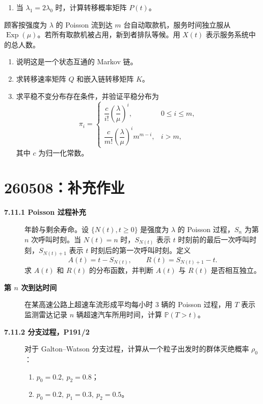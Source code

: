 \documentclass[12pt,a4paper,openany]{ctexrep}
\theoremstyle{definition}
\newcommand{\Pp}{\mathbb{P}}
\newcommand{\Exp}{\operatorname{Exp}}
\begin{document}
\begin{description}
\begin{enumerate}[label=(\arabic*)]
		\item 当 $\lambda_1=2\lambda_0$ 时，计算转移概率矩阵 $P(t)$。
	\end{enumerate}
	\item[\textbf{P250/3，练习 5.8(3)}] 顾客按强度为 $\lambda$ 的 Poisson 流到达 $m$ 台自动取款机，服务时间独立服从 $\Exp(\mu)$。若所有取款机被占用，新到者排队等候。用 $X(t)$ 表示服务系统中的总人数。
	\begin{enumerate}[label=(\arabic*)]
		\item 说明这是一个状态互通的 Markov 链。
		\item 求转移速率矩阵 $Q$ 和嵌入链转移矩阵 $K$。
		\item 求平稳不变分布存在条件，并验证平稳分布为
		\[
		\pi_i=
		\begin{cases}
		\dfrac{c}{i!}\left(\dfrac{\lambda}{\mu}\right)^i,&0\le i\le m,\\[2ex]
		\dfrac{c}{m!}\left(\dfrac{\lambda}{\mu}\right)^i m^{m-i},&i>m,
		\end{cases}
		\]
		其中 $c$ 为归一化常数。
	\end{enumerate}
\end{description}

\section{260508：补充作业}

\begin{description}
	\item[\textbf{7.11.1 Poisson 过程补充}] 年龄与剩余寿命。设 $\{N(t),t\ge0\}$ 是强度为 $\lambda$ 的 Poisson 过程，$S_n$ 为第 $n$ 次呼叫时刻。当 $N(t)=n$ 时，$S_{N(t)}$ 表示 $t$ 时刻前的最后一次呼叫时刻，$S_{N(t)+1}$ 表示 $t$ 时刻后的第一次呼叫时刻。定义
	\[
	A(t)=t-S_{N(t)},\qquad R(t)=S_{N(t)+1}-t.
	\]
	求 $A(t)$ 和 $R(t)$ 的分布函数，并判断 $A(t)$ 与 $R(t)$ 是否相互独立。
	\item[\textbf{第 $n$ 次到达时间}] 在某高速公路上超速车流形成平均每小时 $3$ 辆的 Poisson 过程，用 $T$ 表示监测雷达记录 $n$ 辆超速汽车所用时间，计算 $\Pp(T>t)$。
	\item[\textbf{7.11.2 分支过程，P191/2}] 对于 Galton--Watson 分支过程，计算从一个粒子出发时的群体灭绝概率 $\rho_0$：
	\begin{enumerate}[label=(\arabic*)]
		\item $p_0=0.2,\ p_2=0.8$；
		\item $p_0=0.2,\ p_1=0.3,\ p_2=0.5$。
	\end{enumerate}
\end{description}
\end{document}
